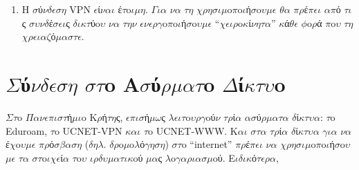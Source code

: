 \documentclass[a4paper,11pt,english]{sphinxmanual}
\begin{document}
\begin{itemize}
\begin{description}
\begin{enumerate}
\item {} 
H \(\sigma\)ύ\(\nu\)\(\delta\)\(\epsilon\)\(\sigma\)\(\eta\) VPN \(\epsilon\)ί\(\nu\)\(\alpha\)\(\iota\) έ\(\tau\)o\(\iota\)\(\mu\)\(\eta\). \(\Gamma\)\(\iota\)\(\alpha\) \(\nu\)\(\alpha\) \(\tau\)\(\eta\) \(\chi\)\(\rho\)\(\eta\)\(\sigma\)\(\iota\)\(\mu\)o\(\pi\)o\(\iota\)ή\(\sigma\)o\(\upsilon\)\(\mu\)\(\epsilon\) \(\theta\)\(\alpha\) \(\pi\)\(\rho\)έ\(\pi\)\(\epsilon\)\(\iota\) \(\alpha\)\(\pi\)ό \(\tau\)\(\iota\)ς \(\sigma\)\(\upsilon\)\(\nu\)\(\delta\)έ\(\sigma\)\(\epsilon\)\(\iota\)ς \(\delta\)\(\iota\)\(\kappa\)\(\tau\)ύo\(\upsilon\) \(\nu\)\(\alpha\) \(\tau\)\(\eta\)\(\nu\) \(\epsilon\)\(\nu\)\(\epsilon\)\(\rho\)\(\gamma\)o\(\pi\)o\(\iota\)ή\(\sigma\)o\(\upsilon\)\(\mu\)\(\epsilon\) “\(\chi\)\(\epsilon\)\(\iota\)\(\rho\)o\(\kappa\)ί\(\nu\)\(\eta\)\(\tau\)\(\alpha\)” \(\kappa\)ά\(\theta\)\(\epsilon\) \(\phi\)o\(\rho\)ά \(\pi\)o\(\upsilon\) \(\tau\)\(\eta\) \(\chi\)\(\rho\)\(\epsilon\)\(\iota\)\(\alpha\)\(\zeta\)ό\(\mu\)\(\alpha\)\(\sigma\)\(\tau\)\(\epsilon\).

\end{enumerate}

\end{description}

\end{itemize}


\section{\(\Sigma\)ύ\(\nu\)\(\delta\)\(\epsilon\)\(\sigma\)\(\eta\) \(\sigma\)\(\tau\)o A\(\sigma\)ύ\(\rho\)\(\mu\)\(\alpha\)\(\tau\)o \(\Delta\)ί\(\kappa\)\(\tau\)\(\upsilon\)o}
\label{\detokenize{HowToWifi::doc}}\label{\detokenize{HowToWifi:id1}}
\(\Sigma\)\(\tau\)o \(\Pi\)\(\alpha\)\(\nu\)\(\epsilon\)\(\pi\)\(\iota\)\(\sigma\)\(\tau\)ή\(\mu\)\(\iota\)o K\(\rho\)ή\(\tau\)\(\eta\)ς, \(\epsilon\)\(\pi\)\(\iota\)\(\sigma\)ή\(\mu\)\(\omega\)ς \(\lambda\)\(\epsilon\)\(\iota\)\(\tau\)o\(\upsilon\)\(\rho\)\(\gamma\)oύ\(\nu\) \(\tau\)\(\rho\)ί\(\alpha\) \(\alpha\)\(\sigma\)ύ\(\rho\)\(\mu\)\(\alpha\)\(\tau\)\(\alpha\) \(\delta\)ί\(\kappa\)\(\tau\)\(\upsilon\)\(\alpha\): \(\tau\)o Eduroam,
\(\tau\)o UCNET-VPN \(\kappa\)\(\alpha\)\(\iota\) \(\tau\)o UCNET-WWW. K\(\alpha\)\(\iota\) \(\sigma\)\(\tau\)\(\alpha\) \(\tau\)\(\rho\)ί\(\alpha\) \(\delta\)ί\(\kappa\)\(\tau\)\(\upsilon\)\(\alpha\) \(\gamma\)\(\iota\)\(\alpha\) \(\nu\)\(\alpha\) έ\(\chi\)o\(\upsilon\)\(\mu\)\(\epsilon\) \(\pi\)\(\rho\)ό\(\sigma\)\(\beta\)\(\alpha\)\(\sigma\)\(\eta\)
(\(\delta\)\(\eta\)\(\lambda\). \(\delta\)\(\rho\)o\(\mu\)o\(\lambda\)ό\(\gamma\)\(\eta\)\(\sigma\)\(\eta\)) \(\sigma\)\(\tau\)o “internet” \(\pi\)\(\rho\)έ\(\pi\)\(\epsilon\)\(\iota\) \(\nu\)\(\alpha\) \(\chi\)\(\rho\)\(\eta\)\(\sigma\)\(\iota\)\(\mu\)o\(\pi\)o\(\iota\)ή\(\sigma\)o\(\upsilon\)\(\mu\)\(\epsilon\) \(\tau\)\(\alpha\) \(\sigma\)\(\tau\)o\(\iota\)\(\chi\)\(\epsilon\)ί\(\alpha\) \(\tau\)o\(\upsilon\)
\(\iota\)\(\rho\)\(\delta\)\(\upsilon\)\(\mu\)\(\alpha\)\(\tau\)\(\iota\)\(\kappa\)oύ \(\mu\)\(\alpha\)ς \(\lambda\)o\(\gamma\)\(\alpha\)\(\rho\)\(\iota\)\(\alpha\)\(\sigma\)\(\mu\)oύ. E\(\iota\)\(\delta\)\(\iota\)\(\kappa\)ό\(\tau\)\(\epsilon\)\(\rho\)\(\alpha\),
\end{document}
